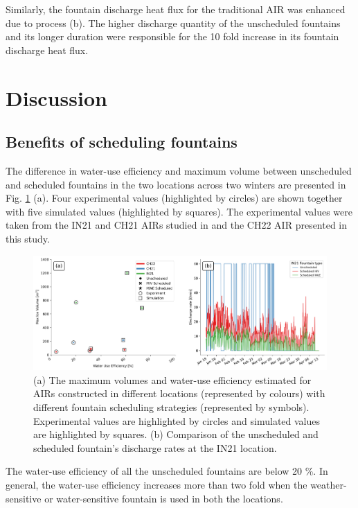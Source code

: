 \documentclass[tc, manuscript]{copernicus}
\begin{document}
Similarly, the fountain discharge heat flux for the traditional AIR was enhanced due to process (b). The higher
discharge quantity of the unscheduled fountains and its longer duration were responsible for the 10 fold
increase in its fountain discharge heat flux.

\section{Discussion}

\subsection{Benefits of scheduling fountains}

The difference in water-use efficiency and maximum volume between unscheduled and scheduled fountains in the two
locations across two winters are presented in Fig. \ref{fig:wue} (a). Four experimental values (highlighted by
circles) are shown together with five simulated values (highlighted by squares).  The experimental values were
taken from the IN21 and CH21 AIRs studied in \citet{balasubramanianInfluenceMeteorologicalConditions2022} and
the CH22 AIR presented in this study. 

\begin{figure}[t]
\includegraphics[width=\textwidth]{Figures/wue.png}

\caption{(a) The maximum volumes and water-use efficiency estimated for AIRs constructed in different locations
(represented by colours) with different fountain scheduling strategies (represented by symbols). Experimental
values are highlighted by circles and simulated values are highlighted by squares. (b) Comparison of
the unscheduled and scheduled fountain's discharge rates at the IN21 location.}

\label{fig:wue}
\end{figure}

The water-use efficiency of all the unscheduled fountains are below 20 \%. In general, the water-use efficiency
increases more than two fold when the weather-sensitive or water-sensitive fountain is used in both the locations.  
\end{document}

